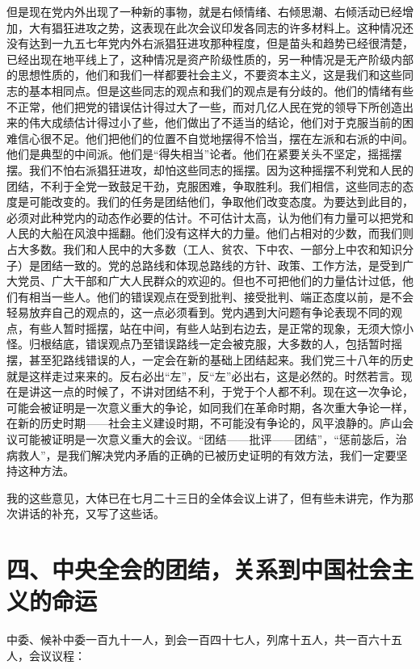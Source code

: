 但是现在党内外出现了一种新的事物，就是右倾情绪、右倾思潮、右倾活动已经增加，大有猖狂进攻之势，这表现在此次会议印发各同志的许多材料上。这种情况还没有达到一九五七年党内外右派猖狂进攻那种程度，但是苗头和趋势已经很清楚，已经出现在地平线上了，这种情况是资产阶级性质的，另一种情况是无产阶级内部的思想性质的，他们和我们一样都要社会主义，不要资本主义，这是我们和这些同志的基本相同点。但是这些同志的观点和我们的观点是有分歧的。他们的情绪有些不正常，他们把党的错误估计得过大了一些，而对几亿人民在党的领导下所创造出来的伟大成绩估计得过小了些，他们做出了不适当的结论，他们对于克服当前的困难信心很不足。他们把他们的位置不自觉地摆得不恰当，摆在左派和右派的中间。他们是典型的中间派。他们是“得失相当”论者。他们在紧要关头不坚定，摇摇摆摆。我们不怕右派猖狂进攻，却怕这些同志的摇摆。因为这种摇摆不利党和人民的团结，不利于全党一致鼓足干劲，克服困难，争取胜利。我们相信，这些同志的态度是可能改变的。我们的任务是团结他们，争取他们改变态度。为要达到此目的，必须对此种党内的动态作必要的估计。不可估计太高，认为他们有力量可以把党和人民的大船在风浪中摇翻。他们没有这样大的力量。他们占相对的少数，而我们则占大多数。我们和人民中的大多数（工人、贫农、下中农、一部分上中农和知识分子）是团结一致的。党的总路线和体现总路线的方针、政策、工作方法，是受到广大党员、广大干部和广大人民群众的欢迎的。但也不可把他们的力量估计过低，他们有相当一些人。他们的错误观点在受到批判、接受批判、端正态度以前，是不会轻易放弃自己的观点的，这一点必须看到。党内遇到大问题有争论表现不同的观点，有些人暂时摇摆，站在中间，有些人站到右边去，是正常的现象，无须大惊小怪。归根结底，错误观点乃至错误路线一定会被克服，大多数的人，包括暂时摇摆，甚至犯路线错误的人，一定会在新的基础上团结起来。我们党三十八年的历史就是这样走过来来的。反右必出“左”，反“左”必出右，这是必然的。时然若言。现在是讲这一点的时候了，不讲对团结不利，于党于个人都不利。现在这一次争论，可能会被证明是一次意义重大的争论，如同我们在革命时期，各次重大争论一样，在新的历史时期——社会主义建设时期，不可能没有争论的，风平浪静的。庐山会议可能被证明是一次意义重大的会议。“团结——批评——团结”，“惩前毖后，治病救人”，是我们解决党内矛盾的正确的已被历史证明的有效方法，我们一定要坚持这种方法。

我的这些意见，大体已在七月二十三日的全体会议上讲了，但有些未讲完，作为那次讲话的补充，又写了这些话。

\date{一九五九年八月二日}
\section{四、中央全会的团结，关系到中国社会主义的命运}

中委、候补中委一百九十一人，到会一百四十七人，列席十五人，共一百六十五人，会议议程：

